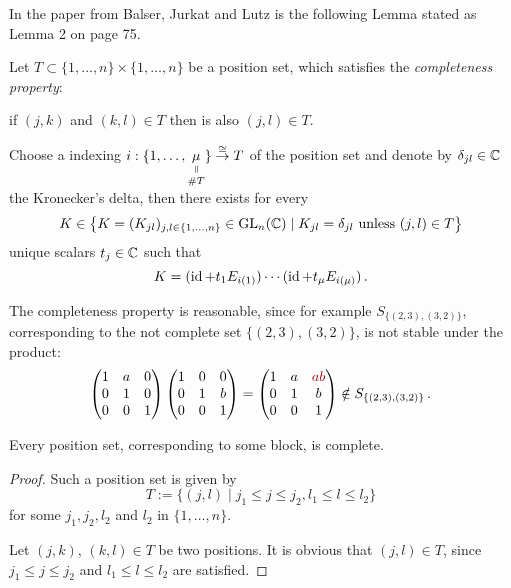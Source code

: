 In the paper \cite{BJL1979Birkhoff} from Balser, Jurkat and Lutz is the
following Lemma stated as Lemma 2 on page 75.
\begin{lem}\label{lem:UniqueDecompositionWotBlocks}
  Let $T\subset\{1,\dots,n\}\times\{1,\dots,n\}$ be a position set, which
  satisfies the \emph{completeness property}:
  \begin{einr}
    if $(j,k)$ and $(k,l)\in T$ then is also $(j,l)\in T$.
  \end{einr}
  Choose a indexing $i:\{1,\dots,
  \underset{\#T}{\underset{\text{\rotatebox[origin=c]{-90}{$=$}}}{\mu}}\}
  \overset{\cong}{\to}T$ of the position set and denote by
  $\delta_{jl}\in\mathbb{C}$ the  Kronecker's delta,
  then there exists for every
  \[
    K\in \left\{K=(K_{jl})_{j,l\in\{1,\dots,n\}}\in\operatorname{GL}_n(\mathbb{C})\mid
      K_{jl}=\delta_{jl} \text{~unless~} (j,l)\in T \right\}
  \]
  unique scalars $t_j\in\mathbb{C}$ such that
  \[
    K=(\operatorname{id} + t_1E_{i(1)})\cdots(\operatorname{id} + t_{\mu}E_{i(\mu)}) \,.
  \]
  \begin{s-rem}
    The completeness property is reasonable, since for example
    $S_{\{(2,3),(3,2)\}}$, corresponding to the not complete set
    $\{(2,3),(3,2)\}$, is not stable under the product:
    \begin{align*}
      \begin{pmatrix}
        1 & a & 0
      \\0 & 1 & 0
      \\0 & 0 & 1
      \end{pmatrix}
      \begin{pmatrix}
        1 & 0 & 0
      \\0 & 1 & b
      \\0 & 0 & 1
      \end{pmatrix}
      =
      \begin{pmatrix}
        1 & a & \textcolor{red!60!black}{ab}
      \\0 & 1 & b
      \\0 & 0 & 1
      \end{pmatrix}
      \notin S_{\{(2,3),(3,2)\}}
      \,.
    \end{align*}
  \end{s-rem}
\end{lem}
\begin{lem}
  Every position set, corresponding to some block, is complete. 
\end{lem}
\begin{proof}
  Such a position set is given by
  \[
    T:=\{(j,l)\mid j_1\leq j\leq j_2, l_1\leq l\leq l_2\}
  \]
  for some $j_1,j_2,l_2$ and $l_2$ in $\{1,\dots,n\}$.

  Let $(j,k)$, $(k,l)\in T$ be two positions.
  It is obvious that $(j,l)\in T$, since $j_1\leq j\leq j_2$ and 
  $l_1\leq l\leq l_2$ are satisfied.
\end{proof}
